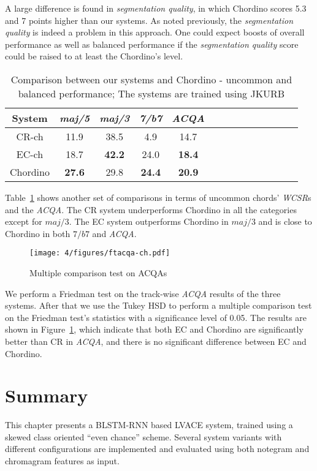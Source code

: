 A large difference is found in \textit{segmentation quality}, in which Chordino scores 5.3 and 7 points higher than our systems. As noted previously, the \textit{segmentation quality} is indeed a problem in this approach. One could expect boosts of overall performance as well as balanced performance if the \textit{segmentation quality} score could be raised to at least the Chordino's level.

\begin{table}[htb]
	\centering
	\scriptsize
	\begin{tabular}{|c|c|c|c|c|c|c|c|c|c|c|c|c|c|}\hline
		System & \textit{maj/5} & \textit{maj/3} & \textit{7/b7} & \textit{ACQA} \\ \hline
		CR-ch & 11.9 & 38.5 & 4.9 & 14.7\\ \hline
		EC-ch & 18.7 & \textbf{42.2} & 24.0 & \textbf{18.4}\\ \hline
		Chordino & \textbf{ 27.6} & 29.8 & \textbf{24.4} & \textbf{20.9}\\ \hline
	\end{tabular}
	\caption{Comparison between our systems and Chordino - uncommon and balanced performance; The systems are trained using JKURB}
	\label{tab:4-cpcd-2}
\end{table}
Table~\ref{tab:4-cpcd-2} shows another set of comparisons in terms of uncommon chords' \textit{WCSR}s and the \textit{ACQA}. The CR system underperforms Chordino in all the categories except for $maj/3$.	The EC system outperforms Chordino in $maj/3$ and is close to Chordino in both $7/b7$ and \textit{ACQA}.

\begin{figure}[h!]
	\centering
	\texttt{[image: 4/figures/ftacqa-ch.pdf]}
	\caption{Multiple comparison test on ACQAs}
	\label{fig:4-ftacqa-ch}
\end{figure}
We perform a Friedman test on the track-wise \textit{ACQA} results of the three systems. After that we use the Tukey HSD to perform a multiple comparison test on the Friedman test's statistics with a significance level of 0.05. The results are shown in Figure~\ref{fig:4-ftacqa-ch}, which indicate that both EC and Chordino are significantly better than CR in \textit{ACQA}, and there is no significant difference between EC and Chordino.

\section{Summary}\label{sec:4-concln}
This chapter presents a BLSTM-RNN based LVACE system, trained using a skewed class oriented ``even chance'' scheme. Several system variants with different configurations are implemented and evaluated using both notegram and chromagram features as input.

